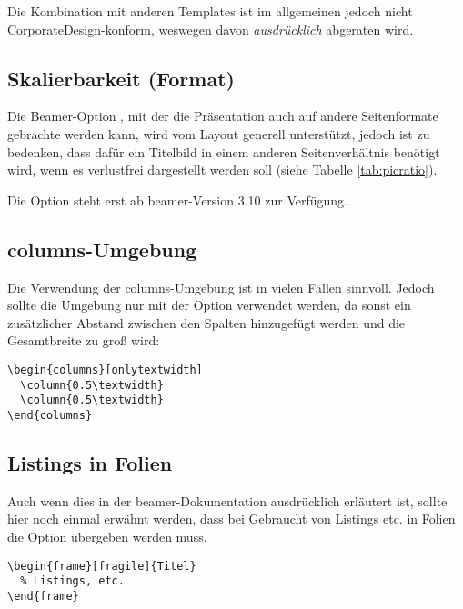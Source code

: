 Die Kombination mit anderen Templates ist im allgemeinen jedoch nicht
CorporateDesign-konform, weswegen davon \emph{ausdrücklich} abgeraten wird.

\subsection{Skalierbarkeit (Format)}

Die Beamer-Option , mit der die Präsentation auch auf
andere Seitenformate gebrachte werden kann, wird vom Layout generell
unterstützt, jedoch ist zu bedenken, dass dafür ein Titelbild in einem anderen
Seitenverhältnis benötigt wird, wenn es verlustfrei dargestellt werden soll
(siehe Tabelle \ref{tab:picratio}).

\begin{hint}
Die Option  steht erst ab beamer-Version 3.10
zur Verfügung.
\end{hint}


\subsection{columns-Umgebung}

Die Verwendung der columns-Umgebung ist in vielen Fällen sinnvoll.
Jedoch sollte die Umgebung nur mit der Option 
verwendet werden, da sonst ein zusätzlicher Abstand zwischen den
Spalten hinzugefügt werden und die Gesamtbreite zu groß wird:

\begin{lstlisting}[morekeywords={onlytextwidth},keywordstyle=\color{tuOrange}]
\begin{columns}[onlytextwidth]
  \column{0.5\textwidth}
  \column{0.5\textwidth}
\end{columns}
\end{lstlisting}


\subsection{Listings in Folien}

Auch wenn dies in der beamer-Dokumentation ausdrücklich erläutert ist,
sollte hier noch einmal erwähnt werden, dass bei Gebraucht von Listings etc.
in Folien die Option  übergeben werden muss.

\begin{lstlisting}[morekeywords={fragile},keywordstyle=\color{tuOrange}]
\begin{frame}[fragile]{Titel}
  % Listings, etc.
\end{frame}
\end{lstlisting}



